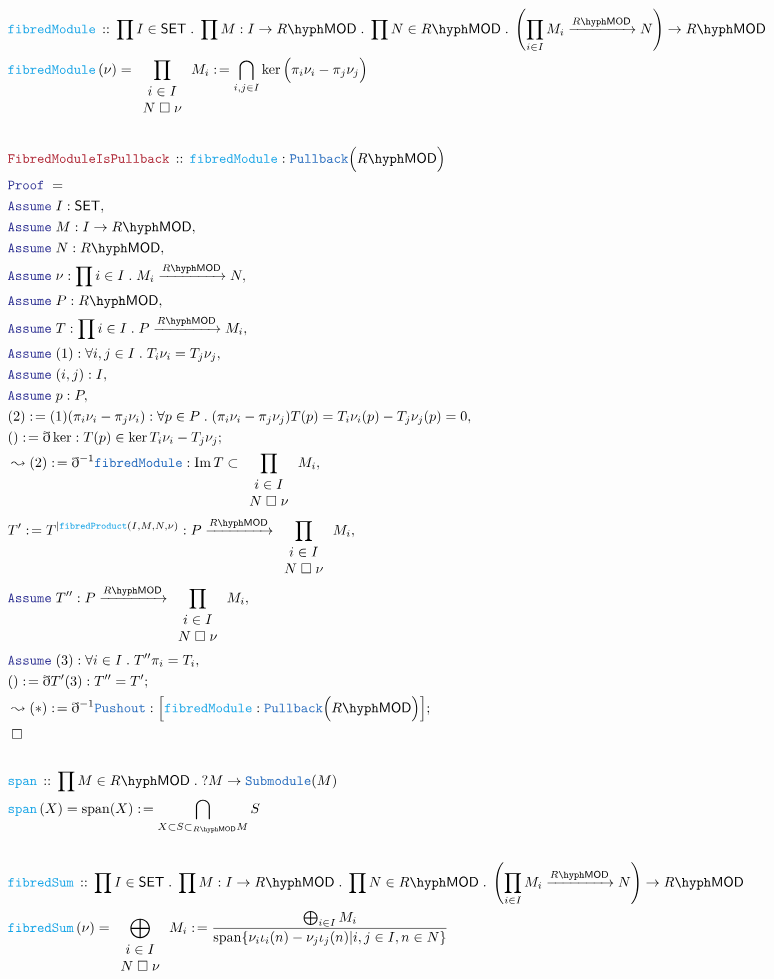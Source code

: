 \documentclass[12pt]{scrartcl}
\newcommand{\TYPE}[1]{\textcolor{NavyBlue}{\mathtt{#1}}}
\newcommand{\FUNC}[1]{\textcolor{Cerulean}{\mathtt{#1}}}
\newcommand{\LOGIC}[1]{\textcolor{Blue}{\mathtt{#1}}}
\newcommand{\THM}[1]{\textcolor{Maroon}{\mathtt{#1}}}
\renewcommand{\.}{\; . \;}
\newcommand{\de}{: \kern 0.1pc =}
\newcommand{\Act}[1]{\left(#1\right)}
\newcommand{\Theorem}[2]{& \THM{#1} \, :: \, #2 \\ & \Proof = \\ }
\newcommand{\DeclareFunc}[2]{& \FUNC{#1} \, :: \, #2 \\}
\newcommand{\DefineNamedFunc}[4]{&  \FUNC{#1}\Act{#2} = #3 \de #4 \\}
\newcommand{\Page}[1]{ \begin{align*} #1 \end{align*}   }
\newcommand{ \bd }{ \ByDef }
\DeclareMathOperator*{\im}{Im}
\newcommand{\Say}[3]{& #1 \de #2 : #3, \\}
\newcommand{\Conclude}[3]{& #1 \de #2 : #3; \\}
\newcommand{\Derive}[3]{& \leadsto #1 \de #2 : #3, \\}
\newcommand{\DeriveConclude}[3]{& \leadsto #1 \de #2 : #3 ; \\}
\newcommand{\Assume}[2]{& \LOGIC{Assume} \; #1 : #2, \\}
\newcommand{\QED}{\; \square}
\newcommand{\EndProof}{& \QED \\}
\newcommand{\ByDef}{\eth}
\newcommand{\Proof}{\LOGIC{Proof} \; }
\newcommand{\Arrow}[1]{\xrightarrow{#1}}
\newcommand{\SET}{\mathsf{SET}}
\newcommand{\submod}[1]{\subset_{\LMOD{#1}}}
\DeclareMathOperator{\Span}{span}
\newcommand{\LMOD}[1]{#1\hyph\mathsf{MOD}}
\begin{document}
\Page{
	\DeclareFunc{fibredModule}{\prod I \in \SET \. \prod M : I \to \LMOD{R} \. \prod N \in \LMOD{R} \. 
		\left( \prod_{i \in I} M_i \Arrow{\LMOD{R}} N  \right) \to \LMOD{R} }
	\DefineNamedFunc{fibredModule}{\nu}{ \prod_{ \begin{array}{c}i \in I \\ N\;\square\;\nu \end{array}} M_i  }
	{\bigcap_{i,j \in I} \ker \Big( \pi_i\nu_i - \pi_j\nu_j \Big)}
	\\
	\Theorem{FibredModuleIsPullback}{ \FUNC{fibredModule} : \TYPE{Pullback}\Big(\LMOD{R}\Big)}
	\Assume{I}{\SET}
	\Assume{M}{I \to \LMOD{R}}
	\Assume{N}{\LMOD{R}}
	\Assume{\nu}{\prod i \in I \. M_i \Arrow{\LMOD{R}} N} 
	\Assume{P}{\LMOD{R}}
	\Assume{T}{\prod i \in I \. P \Arrow{\LMOD{R}} M_i}
	\Assume{(1)}{\forall i,j \in I \. T_i\nu_i = T_j\nu_j }
	\Assume{(i,j)}{I}
	\Assume{p}{P}
	\Say{(2)}{ (1)(\pi_i\nu_i - \pi_j\nu_i)}{\forall p \in P \. (\pi_i\nu_i - \pi_j\nu_j )T(p) = T_i\nu_i(p) - T_j\nu_j(p) = 0 }
	\Conclude{()}{\bd \ker}{T(p) \in \ker T_i\nu_i - T_j\nu_j}
	\Derive{(2)}{\bd^{-1}\TYPE{fibredModule}}{\im T \subset \prod_{\begin{array}{c} i \in I \\ N\;\square\;\nu  \end{array}} M_i }
		\Say{T'}{T^{|\FUNC{fibredProduct}(I,M,N,\nu)}}
		{ P \Arrow{\LMOD{R}} \prod_{\begin{array}{c} i \in I\\ N\; \square\; \nu \end{array}} M_i}
	\Assume{T''}{P \Arrow{\LMOD{R}} \prod_{\begin{array}{c} i \in I\\ N\; \square\; \nu \end{array}} M_i}
	\Assume{(3)}{\forall i \in I \. T''\pi_i = T_i}
	\Conclude{()}{\bd T'(3)}{T'' = T'}
	\DeriveConclude{(*)}{\bd^{-1}\TYPE{Pushout}}{ \Big[\FUNC{fibredModule} : \TYPE{Pullback}\Big(\LMOD{R}\Big)\Big] }
	\EndProof
	\\
	\DeclareFunc{span}{\prod M \in \LMOD{R} \. ?M \to \TYPE{Submodule}(M)}
	\DefineNamedFunc{span}{X}{\Span(X)}{\bigcap_{X \subset S \submod{R} M} S  }
	\\
	\DeclareFunc{fibredSum}{\prod I \in \SET \. \prod M : I \to \LMOD{R} \. \prod N \in \LMOD{R} \. 
		\left( \prod_{i \in I} M_i \Arrow{\LMOD{R}} N  \right) \to \LMOD{R} }
	\DefineNamedFunc{fibredSum}{\nu}{ \bigoplus_{ \begin{array}{c}i \in I \\ N\;\square\;\nu \end{array}} M_i  }
		{      \frac{\bigoplus_{i \in I} M_i }{\Span\{ \nu_i\iota_i(n) - \nu_j\iota_j(n) |  i,j\in I, n \in N \}}}
}
\end{document}
